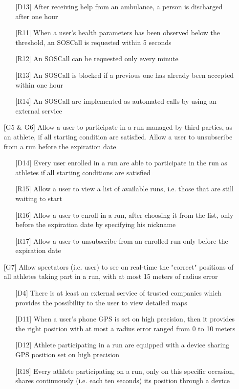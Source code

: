 \begin{itemize}
\begin{itemize}
	\item[{[D13]}] After receiving help from an ambulance, a person is discharged after one hour
	\item[{[R11]}] When a user's health parameters has been observed below the threshold, an SOSCall is requested within 5 seconds
	\item[{[R12]}] An SOSCall can be requested only every minute
	\item[{[R13]}] An SOSCall is blocked if a previous one has already been accepted within one hour
	\item[{[R14]}] An SOSCall are implemented as automated calls by using an external service
	\end{itemize}
\item[{[G5 \& G6]}] Allow a user to participate in a run managed by third parties, as an athlete, if all starting condition are satisfied. Allow a user to unsubscribe from a run before the expiration date
	\begin{itemize}
	\item[{[D14]}] Every user enrolled in a run are able to participate in the run as athletes if all starting conditions are satisfied
	\item[{[R15]}] Allow a user to view a list of available runs, i.e. those that are still waiting to start 
	\item[{[R16]}] Allow a user to enroll in a run, after choosing it from the list, only before the expiration date by specifying his nickname
	\item[{[R17]}] Allow a user to unsubscribe from an enrolled run only before the expiration date
	\end{itemize}
\item[{[G7]}] Allow spectators (i.e. user) to see on real-time the "correct" positions of all athletes taking part in a run, with at most 15 meters of radius error
	\begin{itemize}
	\item[{[D4]}] There is at least an external service of trusted companies which provides the possibility to the user to view detailed maps
	\item[{[D11]}] When a user's phone GPS is set on high precision, then it provides the right position with at most a radius error ranged from 0 to 10 meters
	\item[{[D12]}] Athlete participating in a run are equipped with a device sharing GPS position set on high precision
	\item[{[R18]}] Every athlete participating on a run, only on this specific occasion, shares continuously (i.e. each ten seconds) its position through a device

\end{itemize}
\end{itemize}
